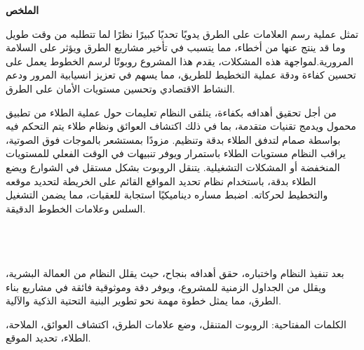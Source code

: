 \documentclass[oneside]{book}
\begin{document}
\begin{RLtext}
\small
\textbf{\Huge الملخص }
\vspace{1em} %

\noindent 
\small
تمثل عملية رسم العلامات على الطرق يدويًا تحديًا كبيرًا نظرًا لما تتطلبه من وقت طويل وما قد ينتج عنها من أخطاء، مما يتسبب في تأخير مشاريع الطرق ويؤثر على السلامة المرورية.لمواجهة هذه المشكلات، يقدم هذا المشروع روبوتًا لرسم الخطوط يعمل على تحسين كفاءة ودقة عملية التخطيط للطريق، مما يسهم في تعزيز انسيابية المرور ودعم النشاط الاقتصادي وتحسين مستويات الأمان على الطرق.


    \vspace{1cm}

من أجل تحقيق أهدافه بكفاءة، يتلقى النظام تعليمات حول عملية الطلاء من تطبيق محمول ويدمج تقنيات متقدمة، بما في ذلك اكتشاف العوائق ونظام طلاء يتم التحكم فيه بواسطة صمام لتدفق الطلاء بدقة وتنظيم. مزودًا بمستشعر بالموجات فوق الصوتية، يراقب النظام مستويات الطلاء باستمرار ويوفر تنبيهات في الوقت الفعلي للمستويات المنخفضة أو المشكلات التشغيلية. يتنقل الروبوت بشكل مستقل في الشوارع ويضع الطلاء بدقة، باستخدام نظام تحديد المواقع القائم على الخريطة لتحديد موقعه والتخطيط لحركاته. اضبط مساره ديناميكيًا استجابة للعقبات، مما يضمن التشغيل السلس وعلامات الخطوط الدقيقة.\\\\

    \vspace{1cm}

\\\\
بعد تنفيذ النظام واختباره، حقق أهدافه بنجاح، حيث يقلل النظام من العمالة البشرية، ويقلل من الجداول الزمنية للمشروع، ويوفر دقة وموثوقية فائقة في مشاريع بناء الطرق، مما يمثل خطوة مهمة نحو تطوير البنية التحتية الذكية والآلية.

    \vspace{2.5cm}

\noindent



الكلمات المفتاحية: الروبوت المتنقل، وضع علامات الطرق، اكتشاف العوائق، الملاحة، الطلاء، تحديد الموقع.

\end{RLtext}



\thispagestyle{empty}
\newpage



\newpage


\tableofcontents
\vspace{1em} %
\end{document}
